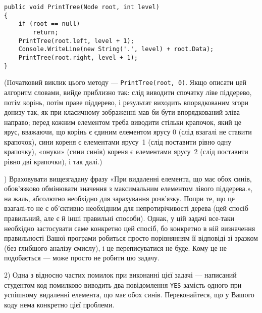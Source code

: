 \begin{verbatim}
public void PrintTree(Node root, int level)
{
    if (root == null)
        return;
    PrintTree(root.left, level + 1);
    Console.WriteLine(new String('.', level) + root.Data);
    PrintTree(root.right, level + 1);
}
\end{verbatim}


(Початковий виклик цього методу --- {\tt PrintTree(root,~0)}. Якщо описати цей алгоритм словами, вийде приблизно так: слід виводити спочатку ліве піддерево, потім корінь, потім праве піддерево, і результат виходить впорядкованим згори донизу так, як при класичному зображенні мав би бути впорядкований зліва направо; перед кожним елементом треба виводити стільки крапочок, який це ярус, вважаючи, що корінь є єдиним елементом ярусу 0 (слід взагалі не ставити крапочок), сини кореня є елементами ярусу~1 (слід поставити рівно одну крапочку), «онуки» (сини синів) кореня є елементами ярусу~2 (слід поставити рівно дві крапочки), і так далі.) 

\Examples

\begin{example}
\end{example}

)
Враховувати вищезгадану фразу «При видаленні елемента, що має обох синів, обов’язково обмінювати значення з максимальним елементом лівого піддерева.», на жаль, абсолютно необхідно для зарахування розв'язку. Попри те, що це взагалі-то не є об'єктивно необхідним для непротирічивості дерева (цей спосіб правильний, але є й інші правильні способи). Однак, у цій задачі все-таки необхідно застосувати саме конкретно цей спосіб, бо конкретно в ній визначення правильності Вашої програми робиться просто порівнянням її відповіді зі зразком (без глибшого аналізу смислу), і це переписуватися не буде. Кому це не подобається --- може просто не робити цю задачу.

2)
Одна з відносно частих помилок при виконанні цієї задачі --- написаний студентом код помилково виводить два повідомлення {\tt YES} замість одного при успішному видаленні елемента, що має обох синів. Переконайтеся, що у Вашого коду нема конкретно цієї проблеми.